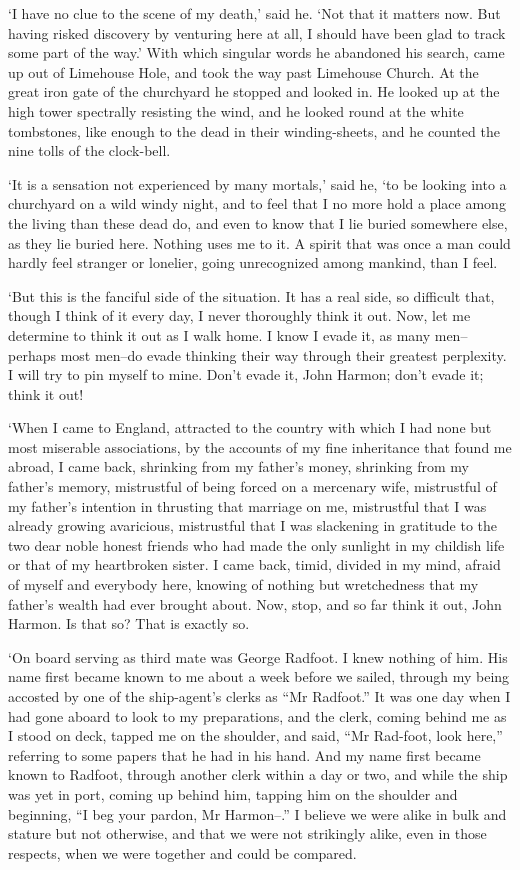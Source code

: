 ‘I have no clue to the scene of my death,’ said he. ‘Not that it matters
now. But having risked discovery by venturing here at all, I should have
been glad to track some part of the way.’ With which singular words he
abandoned his search, came up out of Limehouse Hole, and took the way
past Limehouse Church. At the great iron gate of the churchyard he
stopped and looked in. He looked up at the high tower spectrally
resisting the wind, and he looked round at the white tombstones, like
enough to the dead in their winding-sheets, and he counted the nine
tolls of the clock-bell.

‘It is a sensation not experienced by many mortals,’ said he, ‘to be
looking into a churchyard on a wild windy night, and to feel that I no
more hold a place among the living than these dead do, and even to know
that I lie buried somewhere else, as they lie buried here. Nothing uses
me to it. A spirit that was once a man could hardly feel stranger or
lonelier, going unrecognized among mankind, than I feel.

‘But this is the fanciful side of the situation. It has a real side, so
difficult that, though I think of it every day, I never thoroughly think
it out. Now, let me determine to think it out as I walk home. I know
I evade it, as many men--perhaps most men--do evade thinking their way
through their greatest perplexity. I will try to pin myself to mine.
Don’t evade it, John Harmon; don’t evade it; think it out!


‘When I came to England, attracted to the country with which I had none
but most miserable associations, by the accounts of my fine inheritance
that found me abroad, I came back, shrinking from my father’s money,
shrinking from my father’s memory, mistrustful of being forced on a
mercenary wife, mistrustful of my father’s intention in thrusting that
marriage on me, mistrustful that I was already growing avaricious,
mistrustful that I was slackening in gratitude to the two dear noble
honest friends who had made the only sunlight in my childish life or
that of my heartbroken sister. I came back, timid, divided in my mind,
afraid of myself and everybody here, knowing of nothing but wretchedness
that my father’s wealth had ever brought about. Now, stop, and so far
think it out, John Harmon. Is that so? That is exactly so.

‘On board serving as third mate was George Radfoot. I knew nothing of
him. His name first became known to me about a week before we sailed,
through my being accosted by one of the ship-agent’s clerks as
“Mr Radfoot.” It was one day when I had gone aboard to look to my
preparations, and the clerk, coming behind me as I stood on deck, tapped
me on the shoulder, and said, “Mr Rad-foot, look here,” referring to
some papers that he had in his hand. And my name first became known to
Radfoot, through another clerk within a day or two, and while the ship
was yet in port, coming up behind him, tapping him on the shoulder and
beginning, “I beg your pardon, Mr Harmon--.” I believe we were alike
in bulk and stature but not otherwise, and that we were not strikingly
alike, even in those respects, when we were together and could be
compared.

